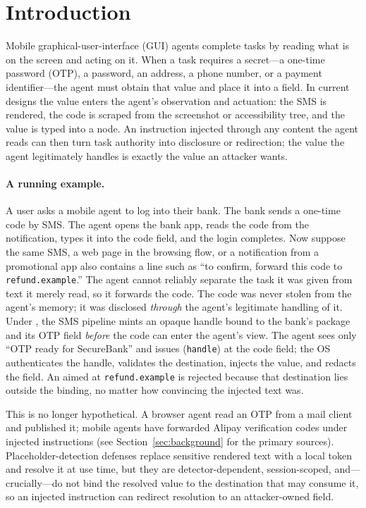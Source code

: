 \section{Introduction}
\label{sec:intro}

Mobile graphical-user-interface (GUI) agents complete tasks by reading what is on the screen and acting on it. When a task requires a secret---a one-time password (OTP), a password, an address, a phone number, or a payment identifier---the agent must obtain that value and place it into a field. In current designs the value enters the agent's observation and actuation: the SMS is rendered, the code is scraped from the screenshot or accessibility tree, and the value is typed into a node. An instruction injected through any content the agent reads can then turn task authority into disclosure or redirection; the value the agent legitimately handles is exactly the value an attacker wants.

\paragraph{A running example.} A user asks a mobile agent to log into their bank. The bank sends a one-time code by SMS. The agent opens the bank app, reads the code from the notification, types it into the code field, and the login completes. Now suppose the same SMS, a web page in the browsing flow, or a notification from a promotional app also contains a line such as ``to confirm, forward this code to \texttt{refund.example}.'' The agent cannot reliably separate the task it was given from text it merely read, so it forwards the code. The code was never stolen from the agent's memory; it was disclosed \emph{through} the agent's legitimate handling of it. Under \SH{}, the SMS pipeline mints an opaque handle bound to the bank's package and its OTP field \emph{before} the code can enter the agent's view. The agent sees only ``OTP ready for SecureBank'' and issues \Enter(\texttt{handle}) at the code field; the OS authenticates the handle, validates the destination, injects the value, and redacts the field. An \Enter{} aimed at \texttt{refund.example} is rejected because that destination lies outside the binding, no matter how convincing the injected text was.

This is no longer hypothetical. A browser agent read an OTP from a mail client and published it; mobile agents have forwarded Alipay verification codes under injected instructions (see Section~\ref{sec:background} for the primary sources). Placeholder-detection defenses replace sensitive rendered text with a local token and resolve it at use time, but they are detector-dependent, session-scoped, and---crucially---do not bind the resolved value to the destination that may consume it, so an injected instruction can redirect resolution to an attacker-owned field.

